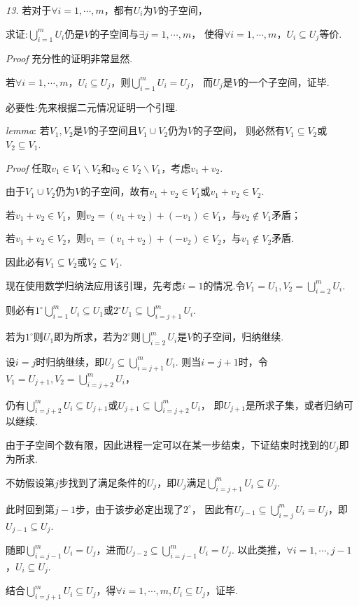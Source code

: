 \textit{13.}
若对于\(\forall i=1,\cdots,m\)，都有\(U_i\)为\(V\)的子空间，

求证:\(\bigcup_{i=1}^m U_i\)仍是\(V\)的子空间与\(\exists j=1,\cdots,m\)，
使得\(\forall i=1,\cdots,m\)，\(U_i \subseteq U_j\)等价.

\textit{Proof}
充分性的证明非常显然.

若\(\forall i=1,\cdots,m\)，\(U_i \subseteq U_j\)，则\(\bigcup_{i=1}^m U_i=U_j\)，
而\(U_j\)是\(V\)的一个子空间，证毕.

必要性:先来根据二元情况证明一个引理.

\textit{lemma}:
若\(V_1,V_2\)是\(V\)的子空间且\(V_1 \cup V_2\)仍为\(V\)的子空间，
则必然有\(V_1 \subseteq V_2\)或\(V_2 \subseteq V_1\).

\textit{Proof}
任取\(v_1 \in V_1 \backslash V_2\)和\(v_2 \in V_2 \backslash V_1\)，考虑\(v_1+v_2\).

由于\(V_1 \cup V_2\)仍为\(V\)的子空间，故有\(v_1+v_2 \in V_1\)或\(v_1+v_2 \in V_2\).

若\(v_1+v_2 \in V_1\)，则\(v_2=(v_1+v_2)+(-v_1) \in V_1\)，与\(v_2 \notin V_1\)矛盾；

若\(v_1+v_2 \in V_2\)，则\(v_1=(v_1+v_2)+(-v_2) \in V_2\)，与\(v_1 \notin V_2\)矛盾.

因此必有\(V_1 \subseteq V_2\)或\(V_2 \subseteq V_1\).

现在使用数学归纳法应用该引理，先考虑\(i=1\)的情况.令\(V_1=U_1,V_2=\bigcup_{i=2}^m U_i\).

则必有\(1^{\circ}\bigcup_{i=1}^m U_i \subseteq U_1\)或\(2^{\circ}U_1 \subseteq \bigcup_{i=j+1}^m U_i\).

若为\(1^{\circ}\)则\(U_1\)即为所求，若为\(2^{\circ}\)则\(\bigcup_{i=2}^m U_i\)是\(V\)的子空间，归纳继续.

设\(i=j\)时归纳继续，即\(U_j \subseteq \bigcup_{i=j+1}^m U_i\).
则当\(i=j+1\)时，令\(V_1=U_{j+1},V_2=\bigcup_{i=j+2}^m U_i\)，

仍有\(\bigcup_{i=j+2}^m U_i \subseteq U_{j+1}\)或\(U_{j+1} \subseteq \bigcup_{i=j+2}^m U_i\)，
即\(U_{j+1}\)是所求子集，或者归纳可以继续.

由于子空间个数有限，因此进程一定可以在某一步结束，下证结束时找到的\(U_j\)即为所求.

不妨假设第\(j\)步找到了满足条件的\(U_j\)，即\(U_j\)满足\(\bigcup_{i=j+1}^m U_i\subseteq U_j\).

此时回到第\(j-1\)步，由于该步必定出现了\(2^{\circ}\)，
因此有\(U_{j-1} \subseteq \bigcup_{i=j}^m U_i=U_j\)，即\(U_{j-1} \subseteq U_j\).

随即\(\bigcup_{i=j-1}^m U_i=U_j\)，进而\(U_{j-2} \subseteq \bigcup_{i=j-1}^m U_i=U_j\).
以此类推，\(\forall i=1,\cdots,j-1\)，\(U_i\subseteq U_j\).

结合\(\bigcup_{i=j+1}^m U_i \subseteq U_j\)，得\(\forall i=1,\cdots,m,U_i \subseteq U_j\)，证毕.


